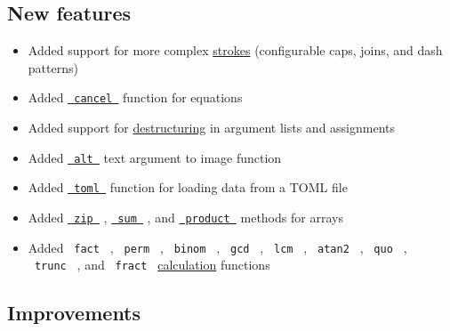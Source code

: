 \subsection{New features}\label{new-features}

\begin{itemize}
\tightlist
\item
  Added support for more complex
  \href{/docs/reference/visualize/stroke/}{strokes} (configurable caps,
  joins, and dash patterns)
\item
  Added \href{/docs/reference/math/cancel/}{\texttt{\ cancel\ }}
  function for equations
\item
  Added support for
  \href{/docs/reference/scripting/\#bindings}{destructuring} in argument
  lists and assignments
\item
  Added
  \href{/docs/reference/visualize/image/\#parameters-alt}{\texttt{\ alt\ }}
  text argument to image function
\item
  Added \href{/docs/reference/data-loading/toml/}{\texttt{\ toml\ }}
  function for loading data from a TOML file
\item
  Added
  \href{/docs/reference/foundations/array/\#definitions-zip}{\texttt{\ zip\ }}
  ,
  \href{/docs/reference/foundations/array/\#definitions-sum}{\texttt{\ sum\ }}
  , and
  \href{/docs/reference/foundations/array/\#definitions-product}{\texttt{\ product\ }}
  methods for arrays
\item
  Added \texttt{\ fact\ } , \texttt{\ perm\ } , \texttt{\ binom\ } ,
  \texttt{\ gcd\ } , \texttt{\ lcm\ } , \texttt{\ atan2\ } ,
  \texttt{\ quo\ } , \texttt{\ trunc\ } , and \texttt{\ fract\ }
  \href{/docs/reference/foundations/calc/}{calculation} functions
\end{itemize}

\subsection{Improvements}\label{improvements}

